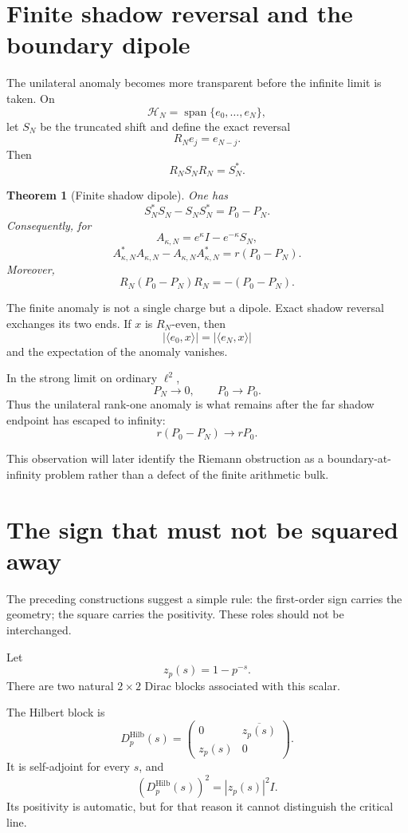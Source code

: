 \documentclass[11pt]{article}
\newtheorem{theorem}{Theorem}[section]
\theoremstyle{definition}
\theoremstyle{remark}
\newcommand{\HH}{\mathcal H}
\begin{document}
\section{Finite shadow reversal and the boundary dipole}

The unilateral anomaly becomes more transparent before the infinite limit is taken.  On
\[
\HH_N=\operatorname{span}\{e_0,\ldots,e_N\},
\]
let \(S_N\) be the truncated shift and define the exact reversal
\[
R_Ne_j=e_{N-j}.
\]
Then
\[
R_NS_NR_N=S_N^*.
\]

\begin{theorem}[Finite shadow dipole]
One has
\[
S_N^*S_N-S_NS_N^*=P_0-P_N.
\]
Consequently, for
\[
A_{\kappa,N}=e^\kappa I-e^{-\kappa}S_N,
\]
\[
\boxed{
A_{\kappa,N}^*A_{\kappa,N}
-A_{\kappa,N}A_{\kappa,N}^*
=
r(P_0-P_N).
}
\]
Moreover,
\[
R_N(P_0-P_N)R_N=-(P_0-P_N).
\]
\end{theorem}

The finite anomaly is not a single charge but a dipole.  Exact shadow reversal exchanges its two ends.  If \(x\) is \(R_N\)-even, then
\[
|\langle e_0,x\rangle|
=
|\langle e_N,x\rangle|
\]
and the expectation of the anomaly vanishes.

In the strong limit on ordinary \(\ell^2\),
\[
P_N\longrightarrow0,\qquad P_0\longrightarrow P_0.
\]
Thus the unilateral rank-one anomaly is what remains after the far shadow endpoint has escaped to infinity:
\[
r(P_0-P_N)\longrightarrow rP_0.
\]

This observation will later identify the Riemann obstruction as a boundary-at-infinity problem rather than a defect of the finite arithmetic bulk.


\section{The sign that must not be squared away}

The preceding constructions suggest a simple rule: the first-order sign carries the geometry; the square carries the positivity.  These roles should not be interchanged.

Let
\[
z_p(s)=1-p^{-s}.
\]
There are two natural \(2\times2\) Dirac blocks associated with this scalar.

The Hilbert block is
\[
D_p^{\mathrm{Hilb}}(s)
=
\begin{pmatrix}
0&\overline{z_p(s)}\\
z_p(s)&0
\end{pmatrix}.
\]
It is self-adjoint for every \(s\), and
\[
\left(D_p^{\mathrm{Hilb}}(s)\right)^2
=
|z_p(s)|^2I.
\]
Its positivity is automatic, but for that reason it cannot distinguish the critical line.
\end{document}
